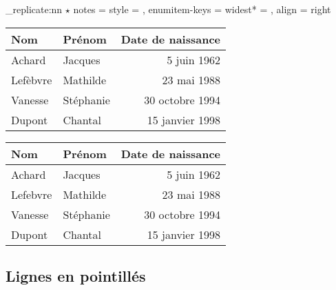 \documentclass[dvipsnames]{article}%
\begin{document}
\begin{scope}
\ExplSyntaxOn
\NewDocumentCommand {}
  { \prg_replicate:nn { \value { #1 } } { \( \star \) } }
\NiceMatrixOptions
  {
    notes =
     {
       style =  ,
       enumitem-keys =
        {
          widest* = \value{tabularnote} ,
          align = right
        }
     }
  }
\ExplSyntaxOff

\begin{Code}
\begin{NiceTabular}{@{}llr@{}}
\toprule \RowStyle{\bfseries}
Nom & Prénom & Date de naissance \\
\midrule
Achard\emph{}
& Jacques & 5 juin 1962 \\
Lefèbvre\emph{}
& Mathilde & 23 mai 1988 \\
Vanesse & Stéphanie & 30 octobre 1994 \\
Dupont & Chantal & 15 janvier 1998 \\
\bottomrule
\end{NiceTabular}
\end{Code}

\begin{center}
\begin{NiceTabular}{@{}llr@{}}
\toprule \RowStyle{\bfseries}
Nom & Prénom & Date de naissance \\
\midrule
Achard
& Jacques & 5 juin 1962 \\
Lefebvre
& Mathilde & 23 mai 1988 \\
Vanesse & Stéphanie & 30 octobre 1994 \\
Dupont & Chantal & 15 janvier 1998 \\
\bottomrule
\end{NiceTabular}
\end{center}
\end{scope}




\subsection{Lignes en pointillés}

\end{document}

